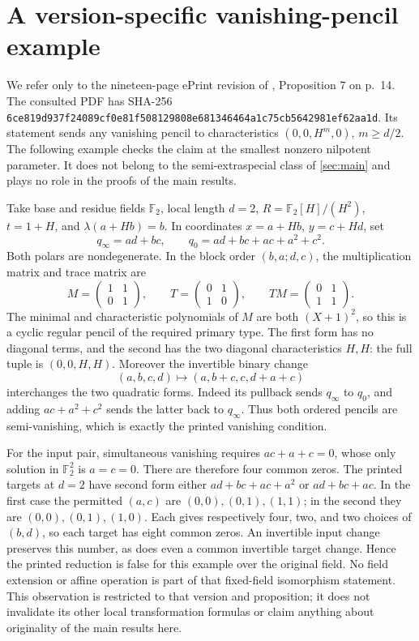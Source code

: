 \documentclass[11pt,a4paper]{article}
\theoremstyle{definition}
\theoremstyle{remark}
\numberwithin{equation}{section}
\newcommand{\F}{\mathbb F}
\begin{document}
\section{A version-specific vanishing-pencil example}\label{app:MPG}
We refer only to the nineteen-page ePrint revision of
\citep{MPG13}, Proposition 7 on p.~14. The consulted PDF has SHA-256
\texttt{6ce819d937f24089cf0e81f508129808}\allowbreak\texttt{e681346464a1c75cb5642981ef62aa1d}.
Its statement sends any vanishing
pencil to characteristics \((0,0,H^m,0)\), \(m\geq d/2\).
The following example checks the claim at the smallest nonzero
nilpotent parameter. It does not belong to the semi-extraspecial class
of \cref{sec:main} and plays no role in the proofs of the main results.

Take base and residue fields \(\F_2\), local length \(d=2\),
\(R=\F_2[H]/(H^2)\), \(t=1+H\), and
\(\lambda(a+Hb)=b\). In coordinates \(x=a+Hb\), \(y=c+Hd\), set
\[
 q_\infty=ad+bc,\qquad
 q_0=ad+bc+ac+a^2+c^2.
\]
Both polars are nondegenerate. In the block order \((b,a;d,c)\),
the multiplication matrix and trace matrix are
\[
 M=\begin{pmatrix}1&1\\0&1\end{pmatrix},\qquad
 T=\begin{pmatrix}0&1\\1&0\end{pmatrix},\qquad
 TM=\begin{pmatrix}0&1\\1&1\end{pmatrix}.
\]
The minimal and characteristic polynomials of \(M\) are both
\((X+1)^2\), so this is a cyclic regular pencil of the required
primary type. The first form has no diagonal terms, and the second
has the two diagonal characteristics \(H,H\): the full tuple is
\((0,0,H,H)\). Moreover the invertible binary change
\[
 (a,b,c,d)\longmapsto(a,b+c,c,d+a+c)
\]
interchanges the two quadratic forms. Indeed its pullback sends
\(q_\infty\) to \(q_0\), and adding \(ac+a^2+c^2\) sends the latter
back to \(q_\infty\). Thus both ordered pencils are semi-vanishing,
which is exactly the printed vanishing condition.

For the input pair, simultaneous vanishing requires
\(ac+a+c=0\), whose only solution in \(\F_2^2\) is \(a=c=0\).
There are therefore four common zeros. The printed targets at \(d=2\)
have second form either
\(ad+bc+ac+a^2\) or \(ad+bc+ac\). In the first case the permitted
\((a,c)\) are \((0,0),(0,1),(1,1)\); in the second they are
\((0,0),(0,1),(1,0)\). Each gives respectively four, two, and two
choices of \((b,d)\), so each target has eight common zeros.
An invertible input change preserves this number, as does even a
common invertible target change. Hence the printed reduction is false
for this example over the original field. No field extension or
affine operation is part of that fixed-field isomorphism statement.
This observation is restricted to that version and proposition; it
does not invalidate its other local transformation formulas or claim
anything about originality of the main results here.
\end{document}

